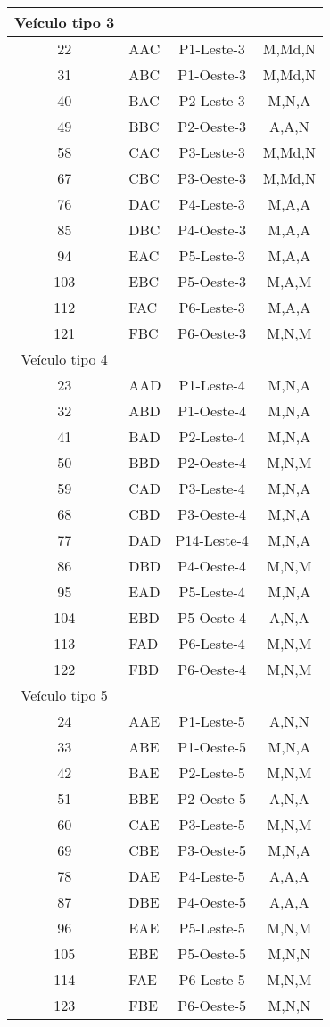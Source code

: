 \documentclass[
	12pt,				%
	openright,			%
	twoside,			%
	a4paper,			%
	english,			%
	french,				%
	spanish,			%
	brazil				%
	]{abntex2}
\begin{document}
\begin{apendicesenv}
\begin{table}[h]
\begin{tabular}{c l c c}
\hline
Veículo tipo 3 & \\
\hline

22 & AAC & P1-Leste-3 & M,Md,N\\
31 & ABC & P1-Oeste-3 & M,Md,N\\
40 & BAC & P2-Leste-3 & M,N,A\\
49 & BBC & P2-Oeste-3 & A,A,N\\
58 & CAC & P3-Leste-3 & M,Md,N\\
67 & CBC & P3-Oeste-3 & M,Md,N\\
76 & DAC & P4-Leste-3 & M,A,A\\
85 & DBC & P4-Oeste-3 & M,A,A\\
94 & EAC & P5-Leste-3 & M,A,A\\
103 & EBC & P5-Oeste-3 & M,A,M\\
112 & FAC & P6-Leste-3 & M,A,A\\
121 & FBC & P6-Oeste-3 & M,N,M\\

\hline
Veículo tipo 4 & \\
\hline

23 & AAD & P1-Leste-4 & M,N,A\\
32 & ABD & P1-Oeste-4 & M,N,A\\
41 & BAD & P2-Leste-4 & M,N,A\\
50 & BBD & P2-Oeste-4 & M,N,M\\
59 & CAD & P3-Leste-4 & M,N,A\\
68 & CBD & P3-Oeste-4 & M,N,A\\
77 & DAD & P14-Leste-4 & M,N,A\\
86 & DBD & P4-Oeste-4 & M,N,M\\
95 & EAD & P5-Leste-4 & M,N,A\\
104 & EBD & P5-Oeste-4 & A,N,A\\
113 & FAD & P6-Leste-4 & M,N,M\\
122 & FBD & P6-Oeste-4 & M,N,M\\

\hline
Veículo tipo 5 & \\
\hline

24 & AAE & P1-Leste-5 & A,N,N\\
33 & ABE & P1-Oeste-5 & M,N,A\\
42 & BAE & P2-Leste-5 & M,N,M\\
51 & BBE & P2-Oeste-5 & A,N,A\\
60 & CAE & P3-Leste-5 & M,N,M\\
69 & CBE & P3-Oeste-5 & M,N,A\\
78 & DAE & P4-Leste-5 & A,A,A\\
87 & DBE & P4-Oeste-5 & A,A,A\\
96 & EAE & P5-Leste-5 & M,N,M\\
105 & EBE & P5-Oeste-5 & M,N,N\\
114 & FAE & P6-Leste-5 & M,N,M\\
123 & FBE & P6-Oeste-5 & M,N,N\\


\end{tabular}
\end{table}
\end{apendicesenv}
\end{document}
